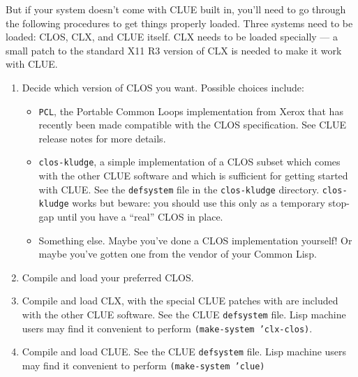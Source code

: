 But if your system doesn't come with CLUE built in, you'll need to go through
the following procedures to get things properly loaded.
Three systems need to be loaded: CLOS, CLX, and CLUE
itself. CLX needs to be loaded specially  --- a small patch to the standard X11
R3 version of CLX is needed to make it work with CLUE.

\begin{enumerate}
\item Decide which version of CLOS you want. Possible choices include:

\begin{itemize}
\item {\tt PCL}, the Portable Common Loops implementation from Xerox that has
recently been made compatible with the CLOS specification. See CLUE release
notes for more details.
\item {\tt clos-kludge}, a simple implementation of a CLOS subset which comes
with
the other CLUE software and which is sufficient for getting started with CLUE.
See the {\tt defsystem} file in the {\tt clos-kludge} directory.
{\tt clos-kludge} works but beware: you should use this only as a temporary
stop-gap until you have a ``real'' CLOS in place.
\item Something else. Maybe you've done a CLOS implementation yourself! Or maybe
you've gotten one from the vendor of your Common Lisp.
\end{itemize}

\item Compile and load your preferred CLOS.

\begin{center}  \end{center}


\item Compile and load CLX, with the special CLUE patches with are included with
the other CLUE software.  See the CLUE {\tt defsystem} file.  Lisp machine
users may find it convenient to perform {\tt (make-system 'clx-clos)}.

\item Compile and load CLUE. See the CLUE {\tt defsystem} file.  Lisp machine
users may find it convenient to perform {\tt (make-system 'clue)}

\end{enumerate}

